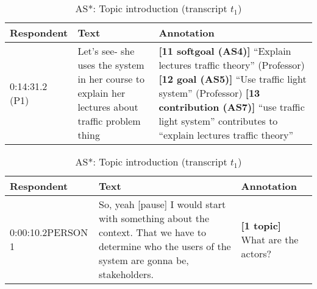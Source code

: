 \begin{table}[!htbp]
\begin{tabular}{|p{20mm}|p{50mm}|p{80mm}|}
\hline
Respondent & Text & Annotation\\
\hline
0:14:31.2 (P1) & Let's see- she uses the system in her course to explain her lectures about traffic problem thing & \textbf{[11 softgoal (AS4)]} ``Explain lectures traffic theory'' (Professor)\newline
\textbf{[12 goal (AS5)]} ``Use traffic light system'' (Professor)\newline
\textbf{[13 contribution (AS7)]} ``use traffic light system'' contributes to ``explain lectures traffic theory''\\
\hline
\end{tabular}
\caption{AS4: softgoal, AS5: goal, AS7: contribution (transcript $t_3$)}
\label{table:transcript:as4-as5-as7}

\begin{tabular}{|p{20mm}|p{90mm}|p{40mm}|}
\hline
Respondent & Text & Annotation\\
\hline
0:00:10.2\newline PERSON 1 & 	So, yeah [pause] I would start with something about the context. That we have to determine who the users of the system are gonna be, stakeholders. & \textbf{[1 topic]} What are the actors?\\
\hline
\end{tabular}
\caption{AS*: Topic introduction (transcript $t_1$)}
\label{table:transcript:as-star}
\end{table}


